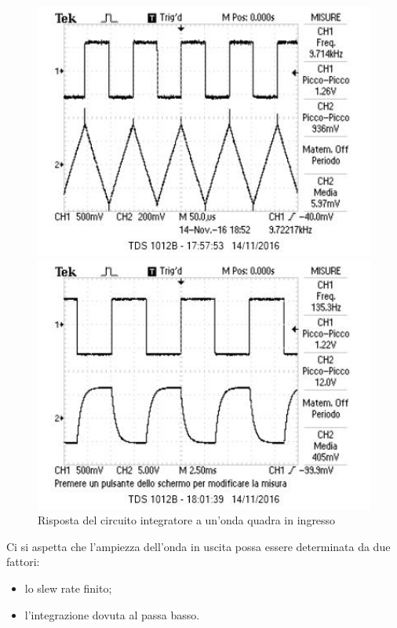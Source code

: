 \documentclass[10pt,a4paper]{article}
\begin{document}
\begin{figure}[h!]
	\begin{minipage}[t]{0.45\textwidth}
		\centering
		\includegraphics[width=1\textwidth]{../oscilloscopio/sqint.jpg}
	\end{minipage}
	\begin{minipage}[t]{0.45\textwidth}
		\centering
		\includegraphics[width=1\textwidth]{../oscilloscopio/sqexp.jpg}
	\end{minipage}
	\caption{Risposta del circuito integratore a un'onda quadra in ingresso}
	\label{fig:intsq}
\end{figure}

Ci si aspetta che l'ampiezza dell'onda in uscita possa essere determinata da due fattori:
\begin{itemize}
\item lo slew rate finito;
\item l'integrazione dovuta al passa basso.
\end{itemize}
\end{document}
